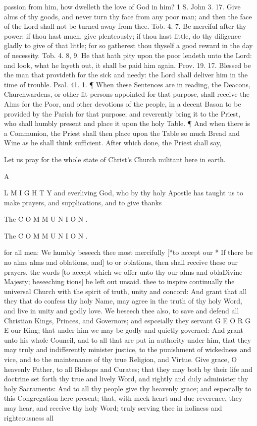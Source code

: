 passion from him, how dwelleth the love of God in him? 1 S. John 3. 17. Give alms of thy goods, and never turn thy face from any poor man; and then the face of the Lord shall not be turned away from thee. Tob. 4. 7. Be merciful after thy power: if thou hast much, give plenteously; if thou hast little, do thy diligence gladly to give of that little; for so gatherest thou thyself a good reward in the day of necessity. Tob. 4. 8, 9. He that hath pity upon the poor lendeth unto the Lord: and look, what he layeth out, it shall be paid him again. Prov. 19. 17. Blessed be the man that provideth for the sick and needy: the Lord shall deliver him in the time of trouble. Psal. 41. 1. ¶ When these Sentences are in reading, the Deacons, Churchwardens, or other fit persons appointed for that purpose, shall receive the Alms for the Poor, and other devotions of the people, in a decent Bason to be provided by the Parish for that purpose; and reverently bring it to the Priest, who shall humbly present and place it upon the holy Table. ¶ And when there is a Communion, the Priest shall then place upon the Table so much Bread and Wine as he shall think sufficient. After which done, the Priest shall say,

Let us pray for the whole state of Christ’s Church militant here in earth.

A

L M I G H T Y and everliving God, who by thy holy Apostle has taught us to make prayers, and supplications, and to give thanks

The C O M M U N I O N .

The C O M M U N I O N .

for all men: We humbly beseech thee most mercifully [*to accept our * If there be no alms alms and oblations, and] to or oblations, then shall receive these our prayers, the words [to accept which we offer unto thy our alms and oblaDivine Majesty; beseeching tions] be left out unsaid. thee to inspire continually the universal Church with the spirit of truth, unity and concord: And grant that all they that do confess thy holy Name, may agree in the truth of thy holy Word, and live in unity and godly love. We beseech thee also, to save and defend all Christian Kings, Princes, and Governors; and espceially they servant G E O R G E our King; that under him we may be godly and quietly governed: And grant unto his whole Council, and to all that are put in authority under him, that they may truly and indifferently minister justice, to the punishment of wickedness and vice, and to the maintenance of thy true Religion, and Virtue. Give grace, O heavenly Father, to all Bishops and Curates; that they may both by their life and doctrine set forth thy true and lively Word, and rightly and duly administer thy holy Sacraments: And to all thy people give thy heavenly grace; and especially to this Congregation here present; that, with meek heart and due reverence, they may hear, and receive thy holy Word; truly serving thee in holiness and righteousness all

